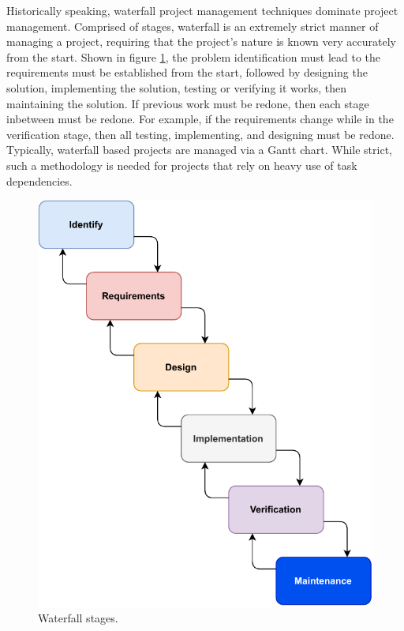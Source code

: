 \documentclass[11pt]{article}
\begin{document}
Historically speaking, \gls{waterfall} project management techniques dominate project management. Comprised of stages, \gls{waterfall} is an extremely strict manner of managing a project, requiring that the project's nature is known very accurately from the start. Shown in figure \ref{fig:waterfall}, the problem identification must lead to the requirements must be established from the start, followed by designing the solution, implementing the solution, testing or verifying it works, then maintaining the solution. If previous work must be redone, then each stage inbetween must be redone. For example, if the requirements change while in the verification stage, then all testing, implementing, and designing must be redone. Typically, \gls{waterfall} based projects are managed via a Gantt chart. While strict, such a methodology is needed for projects that rely on heavy use of task dependencies.

\begin{figure}[t!]
    \centering
    \includegraphics[width=\textwidth]{figures/waterfall_model.pdf}
    \caption{Waterfall stages.}
    \label{fig:waterfall}
\end{figure}
\end{document}
